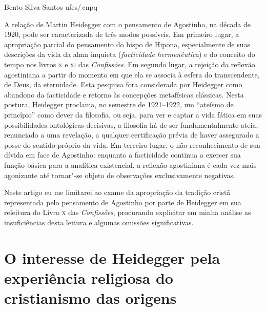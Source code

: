 %
	{Bento Silva Santos}
	{ufes/\,cnp\textnormal{q}} 




A relação de Martin Heidegger com o pensamento de Agostinho, na
década de 1920, pode ser caracterizada de três modos possíveis.
Em primeiro lugar, a apropriação parcial do pensamento do bispo
de Hipona, especialmente de suas descrições da vida da alma
inquieta (\emph{facticidade hermenêutica}) e do conceito do
tempo nos livros \textsc{x} e \textsc{xi} das \emph{Confissões}. Em segundo
lugar, a rejeição da reflexão agostiniana a partir do momento em
que ela se associa à esfera do transcendente, de Deus, da
eternidade. Esta pesquisa fora considerada por Heidegger como
abandono da facticidade e retorno às concepções metafísicas
clássicas. Nesta postura, Heidegger proclama, no semestre de
1921--1922, um “ateísmo de princípio” como dever da filosofia, ou
seja, para ver e captar a vida fática em suas possibilidades
ontológicas decisivas, a filosofia há de ser fundamentalmente
ateia, renunciado a uma revelação, a qualquer certificação
prévia de haver assegurado a posse do sentido próprio da vida.
Em terceiro lugar, o não reconhecimento de sua dívida em face de
Agostinho: enquanto a facticidade continua a exercer sua função
básica para a analítica existencial, a reflexão agostiniana é
cada vez mais agonizante até tornar"-se objeto de observações
exclusivamente negativas. 

Neste artigo eu me limitarei ao exame da apropriação da tradição
cristã representada pelo pensamento de Agostinho por parte de
Heidegger em sua releitura do Livro \textsc{x} das \emph{Confissões},
procurando explicitar em minha análise as insuficiências desta
leitura e algumas omissões significativas.

\section{O interesse de Heidegger pela experiência religiosa
do cristianismo das origens}

